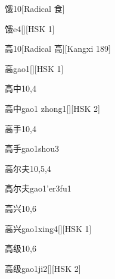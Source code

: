 \begin{entry}{饿}{10}[Radical 食]
  \begin{phonetics}{饿}{e4}[][HSK 1]
  \end{phonetics}
\end{entry}

\begin{entry}{高}{10}[Radical ⾼][Kangxi 189]
  \begin{phonetics}{高}{gao1}[][HSK 1]
  \end{phonetics}
\end{entry}

\begin{entry}{高中}{10,4}
  \begin{phonetics}{高中}{gao1 zhong1}[][HSK 2]
  \end{phonetics}
\end{entry}

\begin{entry}{高手}{10,4}
  \begin{phonetics}{高手}{gao1shou3}
  \end{phonetics}
\end{entry}

\begin{entry}{高尔夫}{10,5,4}
  \begin{phonetics}{高尔夫}{gao1'er3fu1}
  \end{phonetics}
\end{entry}

\begin{entry}{高兴}{10,6}
  \begin{phonetics}{高兴}{gao1xing4}[][HSK 1]
  \end{phonetics}
\end{entry}

\begin{entry}{高级}{10,6}
  \begin{phonetics}{高级}{gao1ji2}[][HSK 2]
  \end{phonetics}
\end{entry}


